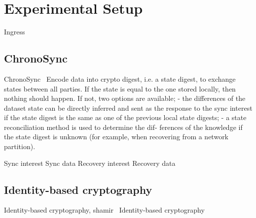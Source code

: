 \chapter{Experimental Setup}\label{chp:experimental_setup}
Ingress


\section{ChronoSync}
ChronoSync~\cite{DBLP:conf/icnp/ZhuA13}
Encode data into crypto digest, i.e. a state digest, to exchange states between all parties. 
If the state is equal to the one stored locally, then nothing should happen.
If not, two options are available; 
- the differences of the dataset state can be directly inferred
and sent as the response to the sync interest if the state
digest is the same as one of the previous local state
digests;
- a state reconciliation method is used to determine the dif-
ferences of the knowledge if the state digest is unknown
(for example, when recovering from a network partition).

Sync interest
Sync data
Recovery interest
Recovery data

\section{Identity-based cryptography}
Identity-based cryptography, shamir~\cite{DBLP:conf/crypto/Shamir84}
Identity-based cryptography~\cite{DBLP:conf/icnp/ZhangCXWSW11}

